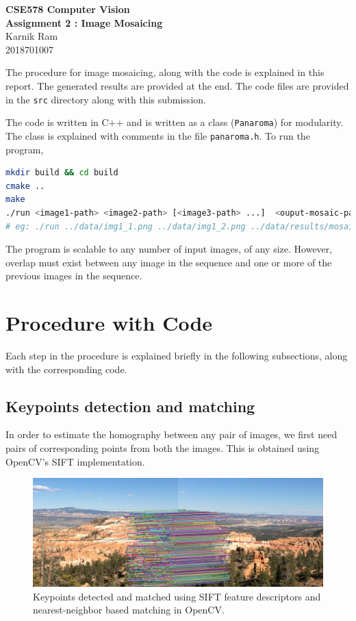 \documentclass[a4paper,11]{article}
\begin{document}
\begin{center}
  \large{\textbf{CSE578 Computer Vision}}\\
  \Large{\textbf{Assignment 2 : Image Mosaicing}}\\
  \vspace{1em}
  Karnik Ram\\
  2018701007
\end{center}

The procedure for image mosaicing, along with the code is explained in this report. The generated results are provided at the end. The code files are provided in the \texttt{src} directory along with this submission.

The code is written in C++ and is written as a class (\texttt{Panaroma}) for modularity. The class is explained with comments in the file \texttt{panaroma.h}. To run the program,

\begin{lstlisting}[language=bash]
mkdir build && cd build
cmake ..
make
./run <image1-path> <image2-path> [<image3-path> ...]  <ouput-mosaic-path>
# eg: ./run ../data/img1_1.png ../data/img1_2.png ../data/results/mosaic1.png
\end{lstlisting}

The program is scalable to any number of input images, of any size. However, overlap must exist between any image in the sequence and one or more of the previous images in the sequence.


\section{Procedure with Code}
Each step in the procedure is explained briefly in the following subsections, along with the corresponding code.
  \subsection{Keypoints detection and matching}
  
  In order to estimate the homography between any pair of images, we first need pairs of corresponding points from both the images. This is obtained using OpenCV's SIFT implementation.
  \begin{figure}[H]
    \centering
    \includegraphics[width=0.8\linewidth]{sift-eg}
    \caption{Keypoints detected and matched using SIFT feature descriptors and nearest-neighbor based matching in OpenCV.}
  \end{figure}
\end{document}
